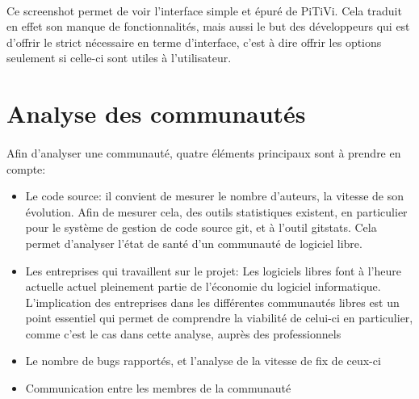 \paragraph{}

Ce screenshot permet de voir l'interface simple et épuré de PiTiVi. Cela
traduit en effet son manque de fonctionnalités, mais aussi le but des
développeurs qui est d'offrir le strict nécessaire en terme d'interface,
c'est à dire offrir les options seulement si celle-ci sont utiles à
l'utilisateur.

\newpage \section{Analyse des communautés}

\paragraph{}

Afin d'analyser une communauté, quatre éléments principaux sont à
prendre en compte:

\begin{itemize}

  \item {Le code source: il convient de mesurer le nombre d'auteurs, la
  vitesse de son évolution. Afin de mesurer cela, des outils statistiques
    existent, en particulier pour le système de gestion de code
    source git, et à l'outil gitstats. Cela permet
    d'analyser l'état de santé d'un communauté de logiciel libre.}

  \item {Les entreprises qui travaillent sur le projet: Les logiciels
  libres
    font à l'heure actuelle actuel pleinement partie de l'économie
    du logiciel informatique. L'implication des entreprises dans les
    différentes communautés libres est un point essentiel qui permet
    de comprendre la viabilité de celui-ci en particulier, comme c'est
    le cas dans cette analyse, auprès des professionnels}

  \item {Le nombre de bugs rapportés, et l'analyse de la vitesse de fix
    de ceux-ci}

  \item {Communication entre les membres de la communauté}

\end{itemize}

